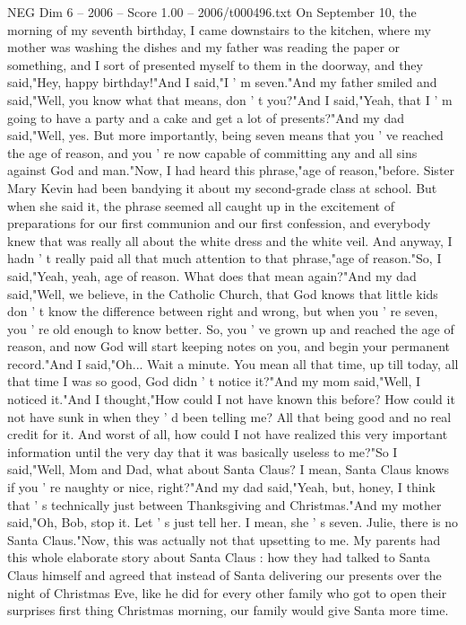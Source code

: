 \begin{textsample}{NEG Dim 6 – 2006 – Score 1.00 – 2006/t000496.txt}  \label{ex:f6_neg_070}
On September 10, the morning of my seventh birthday, I came downstairs to the kitchen, where my mother was washing the dishes and my father was reading the paper or something, and I sort of presented myself to them in the doorway, and they said,"Hey, happy birthday!"And I said,"I ' m seven."And my father smiled and said,"Well, you know what that means, don ' t you?"And I said,"Yeah, that I ' m going to have a party and a cake and get a lot of presents?"And my dad said,"Well, yes.
But more importantly, being seven means that you ' ve reached the age of reason, and you ' re now capable of committing any and all sins against God and man."Now, I had heard this phrase,"age of reason,"before.
Sister Mary Kevin had been bandying it about my second-grade class at school.
But when she said it, the phrase seemed all caught up in the excitement of preparations for our first communion and our first confession, and everybody knew that was really all about the white dress and the white veil.
And anyway, I hadn ' t really paid all that much attention to that phrase,"age of reason."So, I said,"Yeah, yeah, age of reason.
What does that mean again?"And my dad said,"Well, we believe, in the Catholic Church, that God knows that little kids don ' t know the difference between right and wrong, but when you ' re seven, you ' re old enough to know better.
So, you ' ve grown up and reached the age of reason, and now God will start keeping notes on you, and begin your permanent record."And I said,"Oh...
Wait a minute.
You mean all that time, up till today, all that time I was so good, God didn ' t notice it?"And my mom said,"Well, I noticed it."And I thought,"How could I not have known this before?
How could it not have sunk in when they ' d been telling me?
All that being good and no real credit for it.
And worst of all, how could I not have realized this very important information until the very day that it was basically useless to me?"So I said,"Well, Mom and Dad, what about Santa Claus?
I mean, Santa Claus knows if you ' re naughty or nice, right?"And my dad said,"Yeah, but, honey, I think that ' s technically just between Thanksgiving and Christmas."And my mother said,"Oh, Bob, stop it.
Let ' s just tell her.
I mean, she ' s seven.
Julie, there is no Santa Claus."Now, this was actually not that upsetting to me.
My parents had this whole elaborate story about Santa Claus : how they had talked to Santa Claus himself and agreed that instead of Santa delivering our presents over the night of Christmas Eve, like he did for every other family who got to open their surprises first thing Christmas morning, our family would give Santa more time.

\end{textsample}
